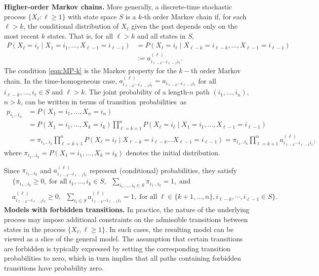 \documentclass[11pt, a4paper]{article}
\numberwithin{equation}{section}
\theoremstyle{plain}
\theoremstyle{definition}
\begin{document}
\noindent \textbf{Higher-order Markov chains.}
More generally, a discrete-time stochastic process $\{X_{\ell} : \ell \ge 1\}$ with state space $S$ is a $k$-th order Markov chain if, for each $\ell > k$, the conditional distribution of $X_{\ell}$ given the past depends only on the most recent $k$ states. That is, for all $\ell > k$ and all states in $S$,
\begin{align}
P(X_{\ell} = i_{\ell} \mid X_1 = i_1, \dots, X_{\ell-1} = i_{\ell-1})
&= P(X_{\ell} = i_{\ell} \mid X_{\ell-k}=i_{\ell-k}, \dots, X_{\ell-1}=i_{\ell-1}) \nonumber\\
&:= a^{(\ell)}_{i_{\ell-k}\cdots i_{\ell-1} i_{\ell}}. \label{eqn:MP-k}
\end{align}
The condition \eqref{eqn:MP-k} is the Markov property for the $k-$th order Markov chain.  In the time-homogeneous case, $a^{(\ell)}_{i_{\ell-k}\cdots i_{\ell-1} i_{\ell}}=a_{i_{\ell-k}\cdots i_{\ell-1} i_{\ell}}$ for all $i_{\ell-k},\ldots,i_{\ell} \in S$ and  $\ell > k$.
The joint probability of a length-$n$ path $(i_1,\ldots,i_n)$, $n > k$, can be written in terms of transition~probabilities~as \\
\begin{align}
p_{i_1 \ldots i_n}
&= P(X_1=i_1,\ldots,X_n=i_n) \nonumber\\
&= P(X_1=i_1,\ldots,X_k=i_k)\prod_{\ell=k+1}^n P(X_{\ell}=i_{\ell} \mid X_1=i_1,\ldots,X_{\ell-1}=i_{\ell-1}) \nonumber\\
&= \pi_{i_1 \ldots i_k}\prod_{\ell=k+1}^n P(X_{\ell}=i_{\ell} \mid X_{\ell-k}=i_{\ell-k}\ldots X_{\ell-1}=i_{\ell-1})
= \pi_{i_1 \ldots i_k}\prod_{\ell=k+1}^n a^{(\ell)}_{i_{\ell-k}\cdots i_{\ell-1} i_{\ell}}, \label{eqn:pathprob-k}
\end{align}
where $\pi_{i_1 \ldots i_k}=P(X_1=i_1,\ldots,X_k=i_k)$ denotes the initial distribution.

Since $\pi_{i_1 \ldots i_k}$ and $a^{(\ell)}_{i_{\ell-k}\cdots i_{\ell-1} i_{\ell}}$ represent (conditional) probabilities, they satisfy 
\begin{align}
& \biggl\{ \pi_{i_1 \ldots i_k} \geq 0, \;  \text{for all} \;  i_1,\ldots,i_k \in S, \; \; \sum_{i_1,\ldots,i_k \in S} \pi_{i_1 \ldots i_k}=1, \; \text{and} \nonumber \\ 
& a^{(\ell)}_{i_{\ell-k}\cdots i_{\ell-1} i_{\ell}} \geq 0, \;  
\;  
\sum_{i_{\ell} \in S} a^{(\ell)}_{i_{\ell-k}\cdots i_{\ell-1} i_{\ell}}=1, \; \text{for all} \;  \ell \in \{k+1,\ldots,n\}, i_{\ell-k},\cdots,i_{\ell-1}\in S \biggr\}. \label{constraints:korder}
\end{align}
\noindent\textbf{Models with forbidden transitions.}
In practice, the nature of the underlying process may impose additional constraints on the admissible
transitions between states in the process $\{X_{\ell}, \ell \ge 1\}$. In such cases, the resulting model
can be viewed as a slice of the general model. The assumption that certain transitions are forbidden
is typically expressed by setting the corresponding transition probabilities to zero, which in turn
implies that all paths containing forbidden transitions have probability zero. 
\end{document}
